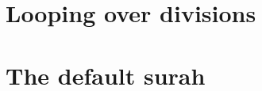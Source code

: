 \documentclass{article}
\begin{document}
\section{Looping over divisions}

\section{The default surah}
\begin{arab}[utf]\quransurah*\end{arab}
\begin{arab}[utf]\quransurah*\end{arab}
\end{document}
